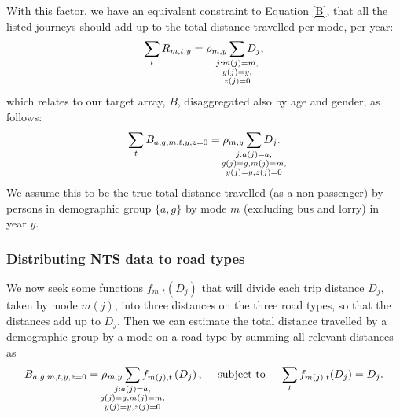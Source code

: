 \documentclass{article}
\begin{document}
With this factor, we have an equivalent constraint to Equation \ref{B}, that all the listed journeys should add up to the total distance travelled per mode, per year:
\begin{equation}\sum_{t}R_{m,t,y} = \rho_{m,y} \smashoperator{\sum_{\substack{j:m(j)=m,\\y(j)=y,\\z(j)=0}}}D_{j},\end{equation}
which relates to our target array, $B$, disaggregated also by age and gender, as follows:
\begin{equation}\sum_{t}B_{a,g,m,t,y,z=0} = \rho_{m,y} \smashoperator{\sum_{\substack{j:a(j)=a,\\g(j)=g,m(j)=m,\\y(j)=y,z(j)=0}}}D_{j}.\end{equation}
We assume this to be the true total distance travelled (as a non-passenger) by persons in demographic group $\{a,g\}$ by mode $m$ (excluding bus and lorry) in year $y$.


\subsubsection{Distributing NTS data to road types}\label{distribute}

We now seek some functions $f_{m,t}(D_j)$ that will divide each trip distance $D_j$, taken by mode $m(j)$, into three distances on the three road types, so that the distances add up to $D_j$. Then we can estimate the total distance travelled by a demographic group by a mode on a road type by summing all relevant distances as $$B_{a,g,m,t,y,z=0}= \rho_{m,y}\smashoperator{\sum_{\substack{j:a(j)=a,\\g(j)=g,m(j)=m,\\y(j)=y,z(j)=0}}}f_{m(j),t}\left(D_{j}\right),
\quad  \text{ subject to } \quad\sum_t f_{m(j),t}(D_j)=D_j.$$
\end{document}
